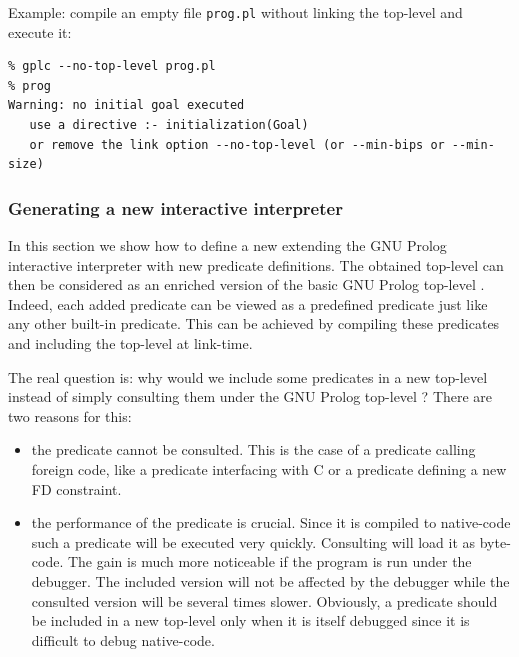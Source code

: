 Example: compile an empty file \texttt{prog.pl} without linking the
top-level and execute it:

\begin{Indentation}
\begin{verbatim}
% gplc --no-top-level prog.pl
% prog
Warning: no initial goal executed
   use a directive :- initialization(Goal)
   or remove the link option --no-top-level (or --min-bips or --min-size)
\end{verbatim}
\end{Indentation}

\subsubsection{Generating a new interactive interpreter}
\label{Generating-a-new-interactive-interpreter}
In this section we show how to define a new  extending the
GNU Prolog interactive interpreter with new predicate definitions. The
obtained top-level can then be considered as an enriched version of the basic
GNU Prolog top-level . Indeed, each
added predicate can be viewed as a predefined predicate just like any other
built-in predicate. This can be achieved by compiling these predicates and
including the top-level at link-time.

The real question is: why would we include some predicates in a new
top-level instead of simply consulting them under the GNU Prolog top-level ?
There are two reasons for this:

\begin{itemize}

\item the predicate cannot be consulted. This is the case of a predicate calling
  foreign code, like a predicate interfacing with C
   or a predicate defining a new FD constraint.

\item the performance of the predicate is crucial. Since it is compiled to
native-code such a predicate will be executed very quickly. Consulting will
load it as byte-code. The gain is much more noticeable if the program is run
under the debugger. The included version will not be affected by the
debugger while the consulted version will be several times slower.
Obviously, a predicate should be included in a new top-level only when it is
itself debugged since it is difficult to debug native-code.

\end{itemize}

